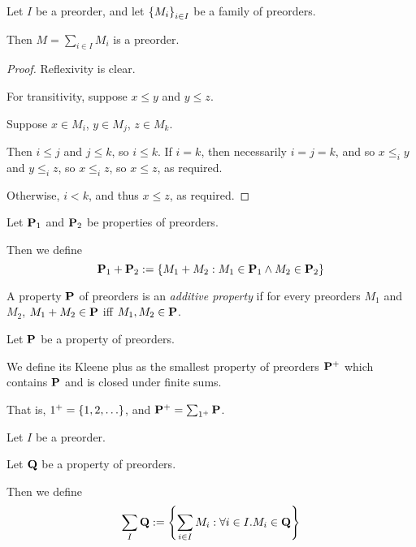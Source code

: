 \begin{lemma}
  Let $I$ be a preorder, and let $\left\{ {M_i} \right\}_{i \in I}$ be a family of preorders.

  Then $M = \sum_{i \in I} M_i$ is a preorder.
\end{lemma}

\begin{proof}
  Reflexivity is clear.

  For transitivity, suppose $x \le y$ and $y \le z$.

  Suppose $x \in M_i$, $y \in M_j$, $z \in M_k$.

  Then $i \le j$ and $j \le k$, so $i \le k$.
  If $i = k$, then necessarily $i = j = k$, and so $x \le_i y$ and $y \le_i z$,
  so $x \le_i z$, so $x \le z$, as required.

  Otherwise, $i < k$, and thus $x \le z$, as required.
\end{proof}

\begin{definition}
  Let $\mathbf{P}_1$ and $\mathbf{P}_2$ be properties of preorders.

  Then we define
  \[
    \mathbf{P}_1 + \mathbf{P}_2 := \left\{ {M_1 + M_2 : M_1 \in \mathbf{P}_1 \wedge M_2 \in \mathbf{P}_2} \right\}
  \]
\end{definition}

\begin{definition}
  A property $\mathbf{P}$ of preorders is an \emph{additive property} if for every preorders $M_1$ and $M_2$,
  $M_1 + M_2 \in \mathbf{P}$ iff $M_1, M_2 \in \mathbf{P}$.
\end{definition}

\begin{definition}
  Let $\mathbf{P}$ be a property of preorders.

  We define its Kleene plus as the smallest property of preorders $\mathbf{P}^+$ which contains $\mathbf{P}$ and is closed under
  finite sums.

  That is, $1^+ = \left\{ {1, 2, \ldots} \right\}$, and $\mathbf{P}^+ = \sum_{1^+}{\mathbf{P}}$.
\end{definition}


\begin{definition}
  Let $I$ be a preorder.

  Let $\mathbf{Q}$ be a property of preorders.

  Then we define
  \[
    \sum_{I}{\mathbf{Q}} := \left\{ {\sum_{i \in I}{M_i} : \forall i \in I. M_i \in \mathbf{Q}} \right\}
  \]
\end{definition}


